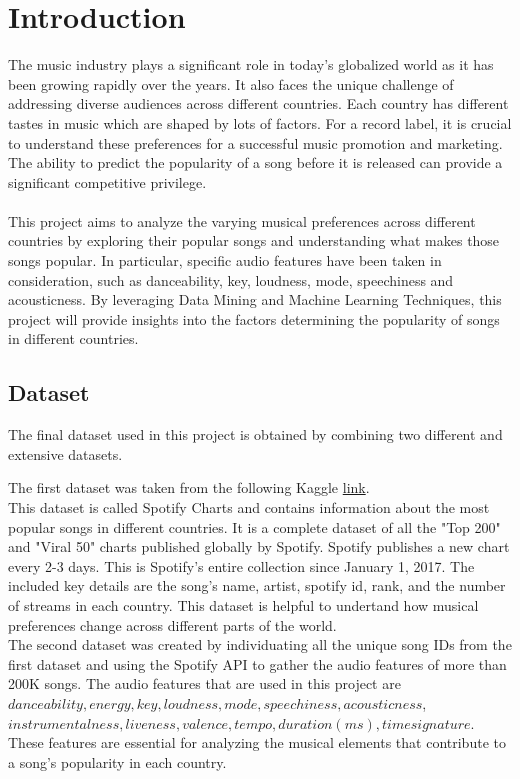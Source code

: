 \chapter{Introduction}

The music industry plays a significant role in today’s globalized world as it has been growing rapidly over the years. It also faces the unique challenge of addressing diverse audiences across
different countries. Each country has different tastes in music which are shaped
by lots of factors. For a record label, it is crucial to understand these preferences for a successful music promotion and marketing. The ability to predict
the popularity of a song before it is released can provide a significant 
competitive privilege.\\
\\
This project aims to analyze the varying musical preferences across different countries by 
exploring their popular songs and understanding what makes those songs popular. In particular, specific audio features have been taken in consideration,  
such as danceability, key, loudness, mode, speechiness and acousticness. 
By leveraging Data Mining and Machine Learning Techniques, this project will provide insights into
the factors determining the popularity of songs in different countries.\\


\section{Dataset}
The final dataset used in this project is obtained by combining two different and extensive datasets.

The first dataset was taken from the following Kaggle \href{https://www.kaggle.com/datasets/dhruvildave/spotify-charts/data} {link}. \\

This dataset is called Spotify Charts and contains information about the most popular songs in different countries. It is a complete dataset 
of all the "Top 200" and "Viral 50" charts published globally by Spotify. Spotify publishes a new chart
 every 2-3 days. This is Spotify's entire collection since January 1, 2017.
 The included key details are the song's name, artist, spotify id, rank, and the number of streams 
 in each country. This dataset is helpful to undertand how musical preferences change across different
 parts of the world. \\

 The second dataset was created by individuating all the unique song IDs from the first dataset and using the Spotify API to gather the audio features of more than 200K songs. The audio features that are used in this project are $danceability, energy, key, loudness, mode, speechiness, acousticness$, 
 $instrumentalness, liveness, valence, tempo, duration (ms), time signature$.  
 These features are essential for analyzing the musical elements that contribute to a song's popularity in each country.\\

